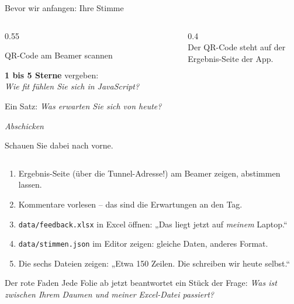 \begin{frame}{Bevor wir anfangen: Ihre Stimme}
  \begin{columns}[onlytextwidth,c]
    \begin{column}{0.55\textwidth}
      \begin{tugenumerate}
        \item QR-Code am Beamer scannen
        \item \textbf{1 bis 5 Sterne} vergeben:\\
              \emph{Wie fit fühlen Sie sich in JavaScript?}
        \item Ein Satz: \emph{Was erwarten Sie sich von heute?}
        \item \emph{Abschicken}
      \end{tugenumerate}
      \vspace{0.6em}
      \itemArrowLine Schauen Sie dabei nach vorne.
    \end{column}
    \begin{column}{0.4\textwidth}
      \centering
      {\fontsize{30}{30}\selectfont\textcolor{tugyellow}{\faStar\faStar\faStar\faStar}\textcolor{colC}{\faStarO}}\\[1em]
      {\small Der QR-Code steht auf der\\Ergebnis-Seite der App.}
    \end{column}
  \end{columns}
\end{frame}

\begin{lecturer}
\begin{frame}{}
  \footnotesize
  \begin{enumerate}
    \item Ergebnis-Seite (über die Tunnel-Adresse!) am Beamer zeigen, abstimmen lassen.
    \item Kommentare vorlesen -- das sind die Erwartungen an den Tag.
    \item \texttt{data/feedback.xlsx} in Excel öffnen: „Das liegt jetzt auf \emph{meinem} Laptop.“
    \item \texttt{data/stimmen.json} im Editor zeigen: gleiche Daten, anderes Format.
    \item Die sechs Dateien zeigen: „Etwa 150 Zeilen. Die schreiben wir heute selbst.“
  \end{enumerate}
  \begin{block}{Der rote Faden}
    Jede Folie ab jetzt beantwortet ein Stück der Frage:
    \emph{Was ist zwischen Ihrem Daumen und meiner Excel-Datei passiert?}
  \end{block}
\end{frame}
\end{lecturer}

